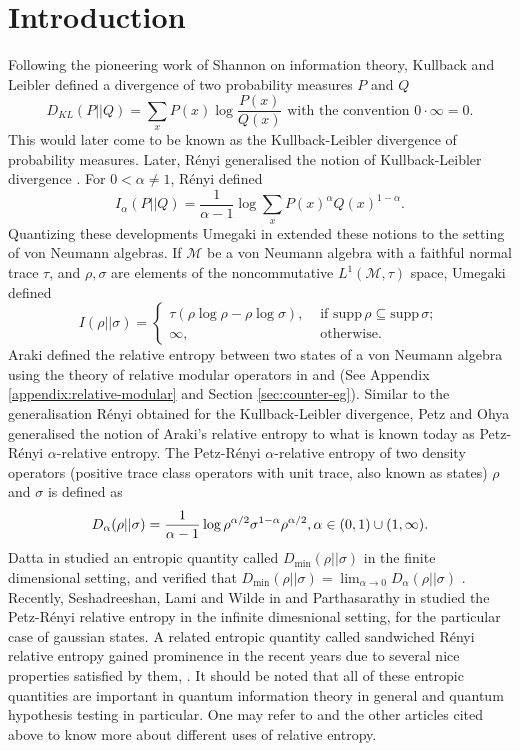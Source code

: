 \documentclass[12pt,a4paper,oneside]{article}
\numberwithin{equation}{section}
\theoremstyle{definition}  %
\theoremstyle{plain}  %
\theoremstyle{remark} %
\let\tr\relax
\DeclareMathOperator{\tr}{Tr}
\begin{document}
\section{Introduction}\label{sec:introduction}
Following the pioneering work of  Shannon on information theory, Kullback and Leibler defined  a divergence of two probability measures $P$ and $Q$ \cite{kullback-leibler-1951} \[D_{KL}(P||Q)= \sum_{x} P(x) \log \frac{P(x)}{Q(x)} \text{ with the convention } 0 \cdot \infty =0.\] This would later come to be known as the Kullback-Leibler divergence of probability measures. Later,  R\'enyi generalised the notion of Kullback-Leibler divergence \cite{renyi1961}. For $0< \alpha \not = 1$, R\'enyi  defined
\[
I_\alpha (P||Q)= \frac{1}{\alpha -1} \log \sum_x P(x)^\alpha Q(x)^{1-\alpha}.
\] 
Quantizing these developments Umegaki in \cite{umegaki-1962} extended these notions to the setting of von Neumann algebras. If
$\mathcal{M}$ be a von Neumann algebra with a faithful normal trace $\tau$, and $\rho, \sigma$ are elements of the noncommutative  $L^1(\mathcal{M},\tau)$ space, Umegaki defined 
\[
I(\rho||\sigma)= \left\{
\begin{array}{ll}
\tau (\rho \log \rho - \rho \log \sigma), &
\text{ if } \text{supp}\, \rho \subseteq \text{supp}\, \sigma;\\
\infty, & \text{ otherwise}.
\end{array}\right.
\] Araki defined the relative entropy between two  states of a von Neumann algebra using the theory of relative modular operators in
 \cite{araki1976relative} and \cite{araki1977relative} (See Appendix \ref{appendix:relative-modular} and Section \ref{sec:counter-eg}). Similar to the generalisation  R\'enyi obtained for the Kullback-Leibler divergence, Petz and Ohya  \cite{petz1986quasientropy, petz-ohya-1993} generalised the notion of Araki's relative entropy to what is known today as Petz-R\'enyi $\alpha$-relative entropy. The Petz-R\'enyi $\alpha$-relative entropy of two density operators (positive trace class operators with unit trace, also known as states) $\rho$ and $\sigma$ is defined as \[D_{\alpha} (\rho \lvert\lvert \sigma) = \frac{1}{\alpha-1}\log \tr \rho^{\alpha/2}\sigma^{1-\alpha}\rho^{\alpha/2}, \alpha \in (0,1)\cup (1,\infty). \] Datta in \cite{Datta2009} studied an entropic quantity called $D_{\operatorname{min}}(\rho||\sigma)$ in the finite dimensional setting, and verified that   $D_{\operatorname{min}}(\rho||\sigma) = \lim_{\alpha\rightarrow0}D_{\alpha}(\rho||\sigma)$  \cite[equation (10)]{Datta2009}. Recently, Seshadreeshan, Lami and Wilde in \cite{Ses-Lam-Wil-2018} and Parthasarathy in \cite{Par2021a} studied the Petz-R\'enyi relative entropy in the infinite dimesnional setting, for the particular case of gaussian states. A related entropic quantity called sandwiched R\'enyi relative entropy gained prominence in the recent years due to several nice properties satisfied by them,  \cite{muller-tomamichel-etal-2013,frank-leib-2013, wilde-winter-yang-2014, Datta_Leditzky_2014, Par2021b}.  It should be noted that all of these entropic quantities are important in quantum information theory in general and quantum hypothesis testing in particular. One may refer to \cite{petz-hiai-1991} and the other articles cited above to know more about different uses of relative entropy.
 
\end{document}
